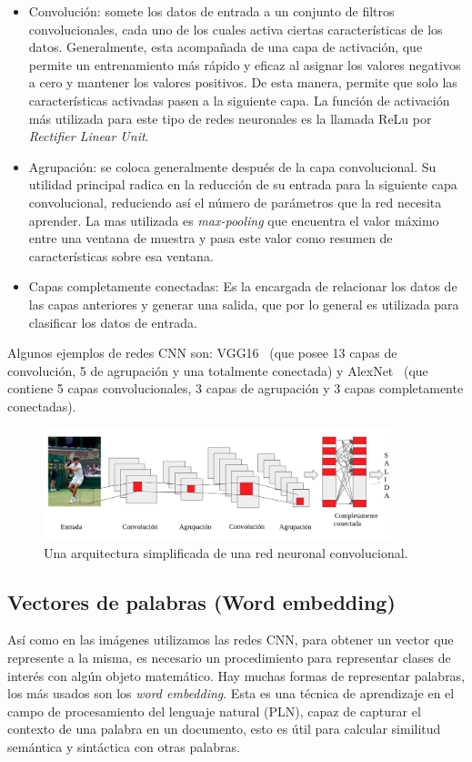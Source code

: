 \begin{itemize}
	\item Convolución: somete los datos de entrada a un conjunto de filtros convolucionales, cada uno de los cuales activa ciertas características de los datos. Generalmente, esta acompañada de una capa de activación, que permite un entrenamiento más rápido y eficaz al asignar los valores negativos a cero y mantener los valores positivos. De esta manera, permite que solo las características activadas pasen a la siguiente capa. La función de activación más utilizada para este tipo de redes neuronales es la llamada ReLu por \textit{Rectifier Linear Unit}. 
	\item Agrupación: se coloca generalmente después de la capa convolucional. Su utilidad principal radica en la reducción de su entrada para la siguiente capa convolucional, reduciendo así el número de parámetros que la red necesita aprender. La mas utilizada es \textit{max-pooling} que encuentra el valor máximo entre una ventana de muestra y pasa este valor como resumen de características sobre esa ventana.
	\item Capas completamente conectadas: Es la encargada de relacionar los datos de las capas anteriores y generar una salida, que por lo general es utilizada para clasificar los datos de entrada.
\end{itemize}


Algunos ejemplos de redes CNN son: VGG16~\cite{simonyan2014very} (que posee 13 capas de convolución, 5 de agrupación y una totalmente conectada) y AlexNet~\cite{krizhevsky2012imagenet} (que contiene 5 capas convolucionales, 3 capas de agrupación y 3 capas completamente conectadas).\\


\begin{figure}
	\centering
	\includegraphics[width=0.9\textwidth]{img/red_cnn.png}
	\caption{Una arquitectura simplificada de una red neuronal convolucional.}
	\label{fig:CNNEjemplo}
\end{figure}

\subsection{Vectores de palabras (Word embedding)} \label{sec:wordembedding}
Así como en las imágenes utilizamos las redes CNN, para obtener un vector que represente a la misma, es necesario un procedimiento para representar clases de interés con algún objeto matemático. Hay muchas formas de representar palabras, los más usados son los \textit{word embedding}. Esta es una técnica de aprendizaje en el campo de procesamiento del lenguaje natural (PLN), capaz de capturar el contexto de una palabra en un documento, esto es útil para calcular similitud semántica y sintáctica con otras palabras.\\

